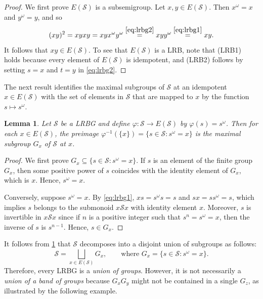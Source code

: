 \documentclass[11pt, oneside, reqno]{amsart}
\newtheorem{lemma}[theorem]{Lemma}
\theoremstyle{definition}
\numberwithin{equation}{section}
\def \SS{{\mathcal{S}}}
\begin{document}
\begin{proof}
    We first prove $E(\SS)$ is a subsemigroup.
    Let $x, y \in E(\SS)$.
    Then $x^\omega = x$ and $y^\omega = y$,
    and so
    \begin{equation*}
        (x y)^2
        = x y x y
        = x y x^\omega y^\omega
        \overset{\cref{eq:lrbg2}}{=}
        x y y^\omega
        \overset{\cref{eq:lrbg1}}{=}
        x y.
    \end{equation*}
    It follows that $x y \in E(\SS)$.
    To see that $E(\SS)$ is a LRB, note that (LRB1) holds because every element
    of $E(\SS)$ is idempotent, and (LRB2) follows by setting $s = x$ and $t
    = y$ in \cref{eq:lrbg2}.
\end{proof}

The next result identifies the maximal subgroups of $\SS$ at an idempotent $x
\in E(\SS)$ with the set of elements in $\SS$ that are mapped to $x$ by the
function $s \mapsto s^\omega$.

\begin{lemma}
    \label{appendix:preimages-of-omega-map-are-maximal-subgroups}
    Let $\SS$ be a LRBG and define $\varphi: \SS \xrightarrow{} E(\SS)$ by
    $\varphi(s) = s^\omega$.
    Then for each $x \in E(\SS)$, the preimage
    $\varphi^{-1}(\{x\}) = \{ s \in \SS : s^\omega = x \}$ is the maximal
    subgroup $G_x$ of $\SS$ at $x$.
\end{lemma}

\begin{proof}
    We first prove $G_x \subseteq \{s \in \SS : s^\omega = x\}$.
    If $s$ is an element of the finite group $G_x$,
    then some positive power of $s$ coincides with the
    identity element of $G_x$, which is $x$.
    Hence, $s^\omega = x$.

    Conversely, suppose $s^\omega = x$.
    By \cref{eq:lrbg1}, $x s = s^\omega s = s$ and
    $s x = s s^\omega = s$, which implies $s$
    belongs to the submonoid $x \SS x$ with identity element $x$.
    Moreover, $s$ is invertible in $x \SS x$ since if $n$ is a positive integer
    such that $s^n = s^\omega = x$, then the inverse of $s$ is $s^{n-1}$.
    Hence, $s \in G_x$.
\end{proof}

It follows from \cref{appendix:preimages-of-omega-map-are-maximal-subgroups} that
$\SS$ decomposes into a disjoint union of subgroups as follows:
\begin{equation}
    \label{LRBG-decomposition-union-of-groups}
    \SS = \bigsqcup_{x \in E(\SS)} G_x,
    \qquad\text{where~} G_x = \{s \in \SS: s^\omega = x\}.
\end{equation}
Therefore, every LRBG is a \emph{union of groups}. However, it is not
necessarily a \emph{union of a band of groups} because $G_x G_y$ might not be
contained in a single $G_z$, as illustrated by the following example.
\end{document}

